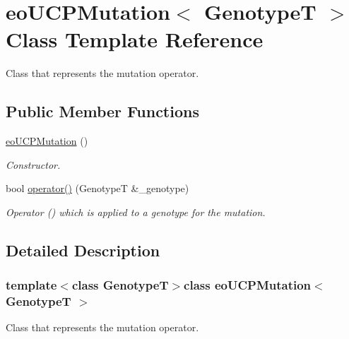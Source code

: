 \hypertarget{classeo_u_c_p_mutation}{\section{eo\-U\-C\-P\-Mutation$<$ \-Genotype\-T $>$ \-Class \-Template \-Reference}
\label{classeo_u_c_p_mutation}
}


\-Class that represents the mutation operator.  


\subsection*{\-Public \-Member \-Functions}
\begin{DoxyCompactItemize}
\item 
\hyperlink{classeo_u_c_p_mutation_a6e9755c1b867f4c5c96f6e1aef17f400}{eo\-U\-C\-P\-Mutation} ()
\begin{DoxyCompactList}\small\item\em \-Constructor. \end{DoxyCompactList}\item 
bool \hyperlink{classeo_u_c_p_mutation_a3873b48908ecb3d564e97dce09a55270}{operator()} (\-Genotype\-T \&\-\_\-genotype)
\begin{DoxyCompactList}\small\item\em \-Operator () which is applied to a genotype for the mutation. \end{DoxyCompactList}\end{DoxyCompactItemize}


\subsection{\-Detailed \-Description}
\subsubsection*{template$<$class Genotype\-T$>$class eo\-U\-C\-P\-Mutation$<$ Genotype\-T $>$}

\-Class that represents the mutation operator. 

